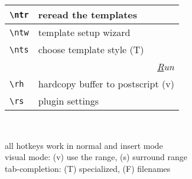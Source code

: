 \documentclass[oneside,10pt,landscape,DIV16]{scrartcl}
\begin{document}
\begin{multicols}{3}
\begin{center}
\begin{tabular}[]{|p{11mm}|p{58mm}|}
\hline \verb'\ntr' & reread the templates      \\
\hline \verb'\ntw' & template setup wizard     \\
\hline \verb'\nts' & choose template style     \hfill (T)\\
%
\hline
\hline
\multicolumn{2}{|r|}{\textsl{\underline{R}un}} \\[1.0ex]
\hline \verb'\rh'    & hardcopy buffer to postscript \hfill (v)\\
\hline \verb'\rs'    & plugin settings               \\
\hline
\end{tabular}\\[1.0ex]
%
\begin{minipage}[b]{72mm}%
\scriptsize{%
all hotkeys work in normal and insert mode \\
visual mode: {\normalsize (v)} use the range,
{\normalsize (s)} surround range \\
tab-completion: {\normalsize (T)} specialized,
{\normalsize (F)} filenames
}%
\end{minipage}
%
\end{center}%
\end{multicols}%
%
\end{document}

